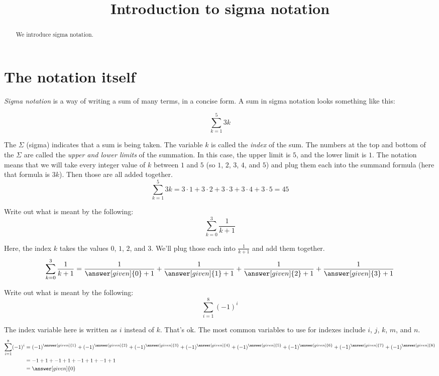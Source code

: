 \documentclass[12pt]{ximera}
\title[Dig-In:]{Introduction to sigma notation}
\author{}
\begin{document}
\begin{abstract}
  We introduce sigma notation.
\end{abstract}
\maketitle

\section{The notation itself}
\emph{Sigma notation} is a way of writing a sum of many terms, in a concise form.  A sum in sigma notation looks something like this:

\[ \sum_{k=1}^{5} 3k \]

The $\Sigma$ (sigma) indicates that a sum is being taken.  The variable $k$ is called the \emph{index} of the sum.  The numbers at the top and bottom of the $\Sigma$
are called the \emph{upper and lower limits} of the summation.  In this case, the upper limit is $5$, and the lower limit is $1$.  The notation means that we will take
every integer value of $k$ between $1$ and $5$ (so $1$, $2$, $3$, $4$, and $5$) and plug them each into the summand formula (here that formula is $3k$).
Then those are all added together.
\[ \sum_{k=1}^{5} 3k= 3\cdot 1 + 3\cdot 2 + 3\cdot 3 + 3\cdot 4 + 3\cdot 5 = 45 \]



\begin{example}
	Write out what is meant by the following:
	\[ \sum_{k=0}^{3} \frac{1}{k+1}\]
	\begin{explanation}
		Here, the index $k$ takes the values $0$, $1$, $2$, and $3$.  We'll plug those each into $\frac{1}{k+1}$ and add them together.
		\[\sum_{k=0}^3 \frac{1}{k+1} = \frac{1}{\answer[given]{0}+1} + \frac{1}{\answer[given]{1}+1} + \frac{1}{\answer[given]{2}+1} + \frac{1}{\answer[given]{3}+1} \]
	\end{explanation}
\end{example}




\begin{example}
	Write out what is meant by the following:
	\[ \sum_{i=1}^{8} \left(-1\right)^i \]
	\begin{explanation}
		The index variable here is written as $i$ instead of $k$.  That's ok.  The most common variables to use for indexes include $i$, $j$, $k$, $m$, and $n$.
		\begin{align*}
			\sum_{i=1}^8 (-1)^i &= (-1)^{\answer[given]{1}} + (-1)^{\answer[given]{2}} + (-1)^{\answer[given]{3}} + (-1)^{\answer[given]{4}} + (-1)^{\answer[given]{5} }+ (-1)^{\answer[given]{6}} + (-1)^{\answer[given]{7}} + (-1)^{\answer[given]{8}} \\
				&= -1 + 1 + -1 + 1 + -1 + 1 + -1 + 1\\
				&= \answer[given]{0}
		\end{align*}	
	\end{explanation}
\end{example}
\end{document}
